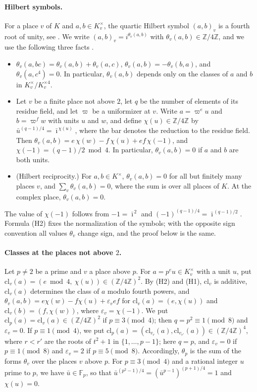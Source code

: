 \documentclass[11pt]{article}
\newcommand{\Z}{\mathbb{Z}}
\newcommand{\F}{\mathbb{F}}
\begin{document}
\paragraph{Hilbert symbols.} For a place $v$ of $K$ and $a,b\in K_v^\times$, the quartic Hilbert symbol $(a,b)_v$ is a fourth root of unity, see \cite[Chapter~V, \S3]{N}. We write $(a,b)_v=i^{\theta_v(a,b)}$ with $\theta_v(a,b)\in\Z/4\Z$, and we use the following three facts \cite[Chapter~V, \S3 and Chapter~VI, \S8]{N}.
\begin{itemize}
\item[(H1)] $\theta_v(a,bc)=\theta_v(a,b)+\theta_v(a,c)$, $\theta_v(a,b)=-\theta_v(b,a)$, and $\theta_v(a,c^4)=0$. In particular, $\theta_v(a,b)$ depends only on the classes of $a$ and $b$ in $K_v^\times/K_v^{\times4}$.
\item[(H2)] Let $v$ be a finite place not above $2$, let $q$ be the number of elements of its residue field, and let $\varpi$ be a uniformizer at $v$. Write $a=\varpi^eu$ and $b=\varpi^fw$ with units $u$ and $w$, and define $\chi(u)\in\Z/4\Z$ by $\bar u^{(q-1)/4}=\bar\imath^{\,\chi(u)}$, where the bar denotes the reduction to the residue field. Then $\theta_v(a,b)=e\,\chi(w)-f\,\chi(u)+ef\,\chi(-1)$, and $\chi(-1)=(q-1)/2\bmod4$. In particular, $\theta_v(a,b)=0$ if $a$ and $b$ are both units.
\item[(H3)] (Hilbert reciprocity.) For $a,b\in K^\times$, $\theta_v(a,b)=0$ for all but finitely many places $v$, and $\sum_v\theta_v(a,b)=0$, where the sum is over all places of $K$. At the complex place, $\theta_v(a,b)=0$.
\end{itemize}
The value of $\chi(-1)$ follows from $-1=\bar\imath^{\,2}$ and $(-1)^{(q-1)/4}=\bar\imath^{\,(q-1)/2}$. Formula (H2) fixes the normalization of the symbols; with the opposite sign convention all values $\theta_v$ change sign, and the proof below is the same.

\paragraph{Classes at the places not above $2$.} Let $p\neq2$ be a prime and $v$ a place above $p$. For $a=p^eu\in K_v^\times$ with a unit $u$, put $\mathrm{cl}_v(a)=(e\bmod4,\ \chi(u))\in(\Z/4\Z)^2$. By (H2) and (H1), $\mathrm{cl}_v$ is additive, $\mathrm{cl}_v(a)$ determines the class of $a$ modulo fourth powers, and $\theta_v(a,b)=e\chi(w)-f\chi(u)+\varepsilon_vef$ for $\mathrm{cl}_v(a)=(e,\chi(u))$ and $\mathrm{cl}_v(b)=(f,\chi(w))$, where $\varepsilon_v=\chi(-1)$. We put $\mathrm{cl}_p(a)=\mathrm{cl}_v(a)\in(\Z/4\Z)^2$ if $p\equiv3\pmod4$; then $q=p^2\equiv1\pmod8$ and $\varepsilon_v=0$. If $p\equiv1\pmod4$, we put $\mathrm{cl}_p(a)=(\mathrm{cl}_{v_r}(a),\mathrm{cl}_{v_{r'}}(a))\in(\Z/4\Z)^4$, where $r<r'$ are the roots of $t^2+1$ in $\{1,\dots,p-1\}$; here $q=p$, and $\varepsilon_v=0$ if $p\equiv1\pmod8$ and $\varepsilon_v=2$ if $p\equiv5\pmod8$. Accordingly, $\theta_p$ is the sum of the forms $\theta_v$ over the places $v$ above $p$. For $p\equiv3\pmod4$ and a rational integer $u$ prime to $p$, we have $\bar u\in\F_p$, so that $\bar u^{(p^2-1)/4}=(\bar u^{p-1})^{(p+1)/4}=1$ and $\chi(u)=0$.
\end{document}
